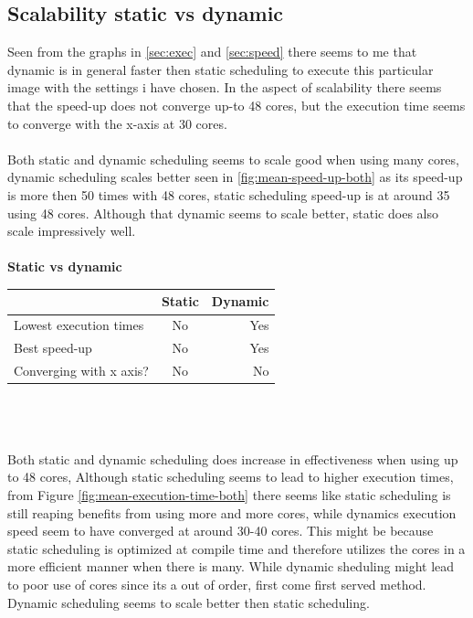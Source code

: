 \documentclass[a4paper,12pt]{article}
\begin{document}
\subsection{Scalability static vs dynamic}
Seen from the graphs in \ref{sec:exec} and \ref{sec:speed} there seems to me that dynamic is in general faster then static scheduling to execute this particular image with the settings i have chosen.
In the aspect of scalability there seems that the speed-up does not converge up-to 48 cores, but the execution time seems to converge with the x-axis at 30 cores.
\\\\
Both static and dynamic scheduling seems to scale good when using many cores, dynamic scheduling scales better seen in \ref{fig:mean-speed-up-both} as its speed-up is more then 50 times with 48 cores,
static scheduling speed-up is at around 35 using 48 cores. Although that dynamic seems to scale better, static does also scale impressively well.
\\\\
\textbf{Static vs dynamic}\\
\begin{tabular}{| l | c | r |}

\hline
  & Static & Dynamic \\ \hline
  Lowest execution times & No & Yes \\ \hline
  Best speed-up & No & Yes \\ \hline
  Converging with x axis? & No & No \\ \hline
\end{tabular}
\\\\\\
Both static and dynamic scheduling does increase in effectiveness when using up to 48 cores,
Although static scheduling seems to lead to higher execution times, from Figure \ref{fig:mean-execution-time-both} there seems like static scheduling is still reaping benefits from using more and more cores, while dynamics execution speed seem to have converged at around 30-40 cores.
This might be because static scheduling is optimized at compile time and therefore utilizes the cores in a more efficient manner when there is many. While dynamic sheduling might lead to poor use of cores since its a out of order, first come first served method.
\\
Dynamic scheduling seems to scale better then static scheduling.
\end{document}
